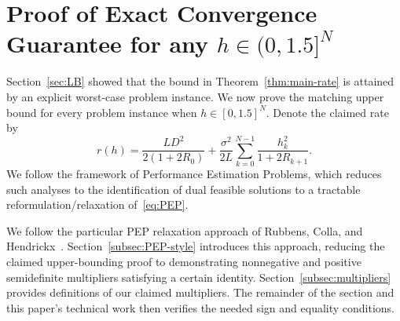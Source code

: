 \documentclass[11pt, hidelinks]{article}
\begin{document}
\section{Proof of Exact Convergence Guarantee for any $h\in (0,1.5]^N$} \label{sec:UB}
Section~\ref{sec:LB} showed that the bound in Theorem~\ref{thm:main-rate} is attained by an explicit worst-case problem instance. We now prove the matching upper bound for every problem instance when $h\in[0,1.5]^N$. Denote the claimed rate by
\[r(h)=\frac{LD^2}{2(1+2R_0)}+\frac{\sigma^2}{2L} \sum_{k=0}^{N-1}
\frac{h_k^2}{1+2R_{k+1}}.\]
We follow the framework of Performance Estimation Problems, which
reduces such analyses to the identification of dual feasible solutions to a tractable reformulation/relaxation of~\eqref{eq:PEP}.


We follow the particular PEP relaxation approach of Rubbens, Colla, and
Hendrickx~\cite{rubbens2025}. Section~\ref{subsec:PEP-style} introduces this approach, reducing the claimed upper-bounding proof to demonstrating nonnegative and positive semidefinite multipliers satisfying a certain identity. Section~\ref{subsec:multipliers} provides definitions of our claimed multipliers. The remainder of the section and this paper's technical work then verifies the needed sign and equality conditions.
\end{document}
